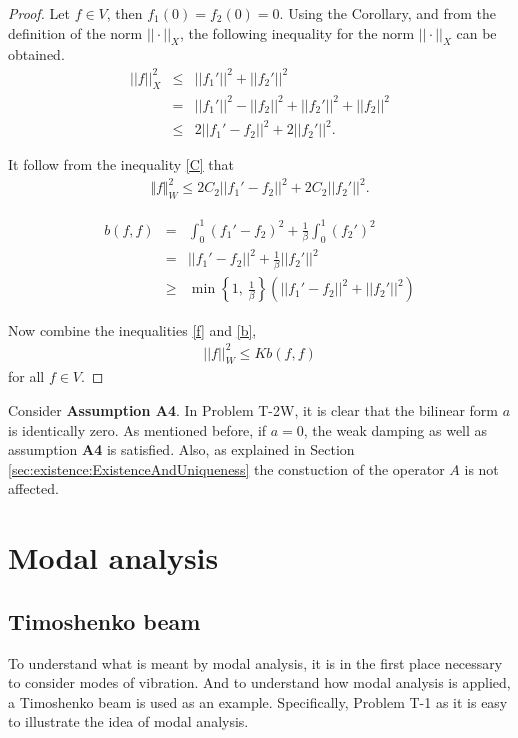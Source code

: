 \documentclass[../../main.tex]{subfiles}
\begin{document}
\begin{proof}
	Let $f \in V$, then $f_1(0) = f_2(0) = 0$. Using the Corollary, and from the definition of the norm $||\cdot||_X$, the following inequality for the norm $||\cdot||_X$ can be obtained.
	\begin{eqnarray*}
		||f||_X^2 & \leq & ||f_1'||^2 + ||f_2'||^2 \\
		& = & ||f_1'||^2 -||f_2||^2 + ||f_2'||^2 +||f_2||^2\\
		& \leq & 2||f_1'-f_2||^2 + 2||f_2'||^2.
	\end{eqnarray*}

	It follow from the inequality \eqref{C} that
	\begin{eqnarray}
		\Vert f \Vert_{W}^2 \leq 2C_2||f_1'-f_2||^2 + 2C_2||f_2'||^2. \label{f}
	\end{eqnarray}

	\begin{eqnarray}
		b(f,f) & = &   \int_0^1 (f_1'-f_2)^2 + \frac{1}{\beta}\int_0^1  (f_2')^2 \nonumber\\
		& = & ||f_1' - f_2||^2 + \frac{1}{\beta}||f_2'||^2 \nonumber\\
		& \geq & \min\left\{1 ,\ \frac{1}{\beta} \right\} \left( ||f_1' - f_2||^2 + ||f_2'||^2\right) \label{b}
	\end{eqnarray}

	Now combine the inequalities \eqref{f} and \eqref{b},
	\begin{eqnarray*}
		||f||_W^2 \leq Kb(f,f)
	\end{eqnarray*} for all $f \in V$.
\end{proof}


Consider \textbf{Assumption A4}. In Problem T-2W, it is clear that the bilinear form $a$ is identically zero. As mentioned before, if $a = 0$, the weak damping as well as assumption \textbf{A4} is satisfied. Also, as explained in Section \ref{sec:existence:ExistenceAndUniqueness} the constuction of the operator $A$ is not affected.


\section{Modal analysis}\label{sec:existence:ModalAnalysis}
\subsection{Timoshenko beam}
To understand what is meant by modal analysis, it is in the first place necessary to consider modes of vibration. And to understand how modal analysis is applied, a Timoshenko beam is used as an example. Specifically, Problem T-1 as it is easy to illustrate the idea of modal analysis.
\end{document}
